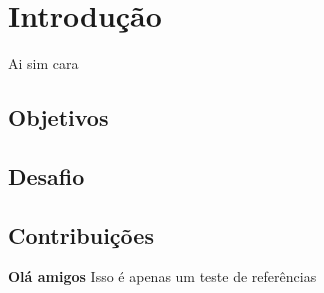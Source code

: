 \chapter{Introdução}
Ai sim cara \cite{greenwade93}
\section{Objetivos}
\section{Desafio}
\section{Contribuições}

\textbf{Olá amigos} Isso é apenas um teste de referências \cite{Rynne2008LinearAnalysis}